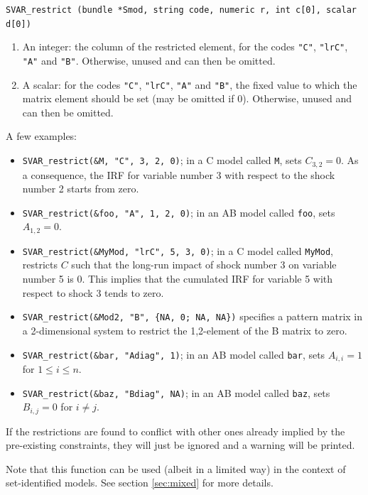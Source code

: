 \documentclass[a4paper,10pt]{article}
\newenvironment{funcdoc}[1]
{\noindent\hrulefill\newline\nopagebreak\texttt{#1}%
\nopagebreak\par\noindent\hrulefill%
\nopagebreak\par\nopagebreak\smallskip\nopagebreak\par}
{\bigskip}
\newcounter{script}[section]
\begin{document}
\begin{funcdoc}{SVAR\_restrict (bundle *Smod, string code, numeric r, int c[0], scalar d[0])}
\begin{enumerate}
\item An integer: the column of the restricted element, for the codes
  \texttt{"C"}, \texttt{"lrC"}, \texttt{"A"} and
  \texttt{"B"}. Otherwise, unused and can then be omitted.
\item A scalar: for the codes \texttt{"C"}, \texttt{"lrC"},
  \texttt{"A"} and \texttt{"B"}, the fixed value to which the matrix
  element should be set (may be omitted if 0). Otherwise, unused and
  can then be omitted.
\end{enumerate}

A few examples: 
\begin{itemize}
\item \texttt{SVAR\_restrict(\&M, "C", 3, 2, 0)}; in a C model called
  \texttt{M}, sets $C_{3,2} = 0$. As a consequence, the IRF for
  variable number 3 with respect to the shock number 2 starts from
  zero.
\item \texttt{SVAR\_restrict(\&foo, "A", 1, 2, 0)}; in an AB model called
  \texttt{foo}, sets $A_{1,2} = 0$.
\item \texttt{SVAR\_restrict(\&MyMod, "lrC", 5, 3, 0)}; in a C model
  called \texttt{MyMod}, restricts $C$ such that the long-run impact
  of shock number 3 on variable number 5 is 0. This implies that the
  cumulated IRF for variable 5 with respect to shock 3 tends to zero.
\item \texttt{SVAR\_restrict(\&Mod2, "B", \{NA, 0; NA, NA\})} specifies a 
  pattern matrix in a 2-dimensional system to restrict the 1,2-element of
  the B matrix to zero. 
\item \texttt{SVAR\_restrict(\&bar, "Adiag", 1)}; in an AB model called
  \texttt{bar}, sets $A_{i,i} = 1$ for $1 \le i \le n$.
\item \texttt{SVAR\_restrict(\&baz, "Bdiag", NA)}; in an AB model called
  \texttt{baz}, sets $B_{i,j} = 0$ for $i \ne j$.
\end{itemize}

If the restrictions are found to conflict with other ones already
implied by the pre-existing constraints, they will just be ignored and
a warning will be printed.

Note that this function can be used (albeit in a limited way) in the
context of set-identified models. See section \ref{sec:mixed} for more details.
\end{funcdoc}
\end{document}
